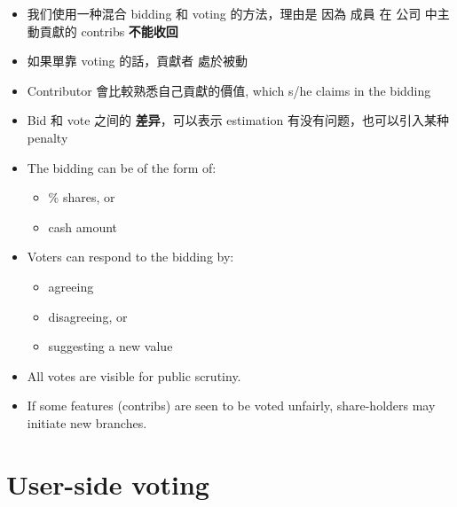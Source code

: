 \documentclass[12pt, orivec]{article}
\begin{document}
\begin{itemize}
	\item 我们使用一种混合 bidding 和 voting 的方法，理由是 因為 成員 在 公司 中主動貢獻的 contribs \textbf{不能收回}

	\item 如果單靠 voting 的話，貢獻者 處於被動
	
	\item Contributor 會比較熟悉自己貢獻的價值, which s/he claims in the bidding
	
	\item Bid 和 vote 之间的 \textbf{差异}，可以表示 estimation 有没有问题，也可以引入某种 penalty

	\item The bidding can be of the form of:
	\begin{itemize}
		\item \% shares, or
		\item cash amount
	\end{itemize}

	\item Voters can respond to the bidding by:
	\begin{itemize}
		\item agreeing
		\item disagreeing, or
		\item suggesting a new value
	\end{itemize}


	\item All votes are visible for public scrutiny.

	\item If some features (contribs) are seen to be voted unfairly, share-holders may initiate new branches.
\end{itemize}

\secttoc
\section{User-side voting}
\end{document}
